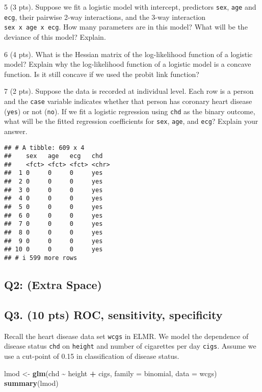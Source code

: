 \documentclass[
]{article}
\newenvironment{Shaded}{\begin{snugshade}}{\end{snugshade}}
\newcommand{\AttributeTok}[1]{\textcolor[rgb]{0.13,0.29,0.53}{#1}}
\newcommand{\FunctionTok}[1]{\textcolor[rgb]{0.13,0.29,0.53}{\textbf{#1}}}
\newcommand{\NormalTok}[1]{#1}
\newcommand{\OtherTok}[1]{\textcolor[rgb]{0.56,0.35,0.01}{#1}}
\newcommand{\SpecialCharTok}[1]{\textcolor[rgb]{0.81,0.36,0.00}{\textbf{#1}}}
\begin{document}
5 (3 pts). Suppose we fit a logistic model with intercept, predictors
\texttt{sex}, \texttt{age} and \texttt{ecg}, their pairwise 2-way
interactions, and the 3-way interaction \texttt{sex\ x\ age\ x\ ecg}.
How many parameters are in this model? What will be the deviance of this
model? Explain.

6 (4 pts). What is the Hessian matrix of the log-likelihood function of
a logistic model? Explain why the log-likelihood function of a logistic
model is a concave function. Is it still concave if we used the probit
link function?

7 (2 pts). Suppose the data is recorded at individual level. Each row is
a person and the \texttt{case} variable indicates whether that person
has coronary heart disease (\texttt{yes}) or not (\texttt{no}). If we
fit a logistic regression using \texttt{chd} as the binary outcome, what
will be the fitted regression coefficients for \texttt{sex},
\texttt{age}, and \texttt{ecg}? Explain your answer.

\begin{verbatim}
## # A tibble: 609 x 4
##    sex   age   ecg   chd  
##    <fct> <fct> <fct> <chr>
##  1 0     0     0     yes  
##  2 0     0     0     yes  
##  3 0     0     0     yes  
##  4 0     0     0     yes  
##  5 0     0     0     yes  
##  6 0     0     0     yes  
##  7 0     0     0     yes  
##  8 0     0     0     yes  
##  9 0     0     0     yes  
## 10 0     0     0     yes  
## # i 599 more rows
\end{verbatim}

\newpage

\subsection{Q2: (Extra Space)}\label{q2-extra-space}

\newpage

\subsection{Q3. (10 pts) ROC, sensitivity,
specificity}\label{q3.-10-pts-roc-sensitivity-specificity}

Recall the heart disease data set \texttt{wcgs} in ELMR. We model the
dependence of disease status \texttt{chd} on \texttt{height} and number
of cigarettes per day \texttt{cigs}. Assume we use a cut-point of 0.15
in classification of disease status.

\begin{Shaded}
\begin{Highlighting}[]
\NormalTok{lmod }\OtherTok{\textless{}{-}} \FunctionTok{glm}\NormalTok{(chd }\SpecialCharTok{\textasciitilde{}}\NormalTok{ height }\SpecialCharTok{+}\NormalTok{ cigs, }\AttributeTok{family =}\NormalTok{ binomial, }\AttributeTok{data =}\NormalTok{ wcgs)}
\FunctionTok{summary}\NormalTok{(lmod)}
\end{Highlighting}
\end{Shaded}
\end{document}
